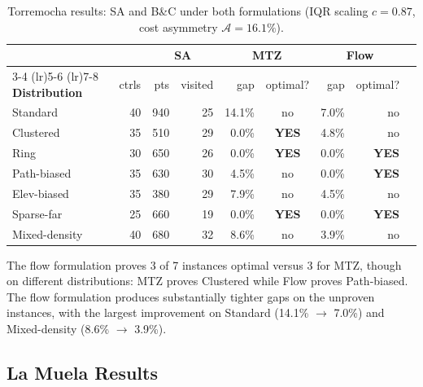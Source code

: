 \documentclass[preprint,11pt]{elsarticle}
\begin{document}
\begin{table}[H]
\centering
\caption{Torremocha results: SA and B\&C under both formulations (IQR scaling $c = 0.87$, cost asymmetry $\mathcal{A} = 16.1\%$).}
\label{tab:torremocha}
\begin{tabular}{lrrrrcrrc}
\toprule
& & \multicolumn{2}{c}{\textbf{SA}} & \multicolumn{2}{c}{\textbf{MTZ}} & \multicolumn{2}{c}{\textbf{Flow}} \\
\cmidrule(lr){3-4} \cmidrule(lr){5-6} \cmidrule(lr){7-8}
\textbf{Distribution} & ctrls & pts & visited & gap & optimal? & gap & optimal? \\
\midrule
Standard        & 40 &  940 & 25 & 14.1\% & no  &  7.0\% & no \\
Clustered       & 35 &  510 & 29 &  0.0\% & \textbf{YES} &  4.8\% & no \\
Ring            & 30 &  650 & 26 &  0.0\% & \textbf{YES} &  0.0\% & \textbf{YES} \\
Path-biased     & 35 &  630 & 30 &  4.5\% & no  &  0.0\% & \textbf{YES} \\
Elev-biased     & 35 &  380 & 29 &  7.9\% & no  &  4.5\% & no \\
Sparse-far      & 25 &  660 & 19 &  0.0\% & \textbf{YES} &  0.0\% & \textbf{YES} \\
Mixed-density   & 40 &  680 & 32 &  8.6\% & no  &  3.9\% & no \\
\bottomrule
\end{tabular}
\end{table}

The flow formulation proves 3 of 7 instances optimal versus 3 for MTZ, though on different distributions: MTZ proves Clustered while Flow proves Path-biased.
The flow formulation produces substantially tighter gaps on the unproven instances, with the largest improvement on Standard (14.1\% $\to$ 7.0\%) and Mixed-density (8.6\% $\to$ 3.9\%).

\subsection{La Muela Results}
\end{document}
